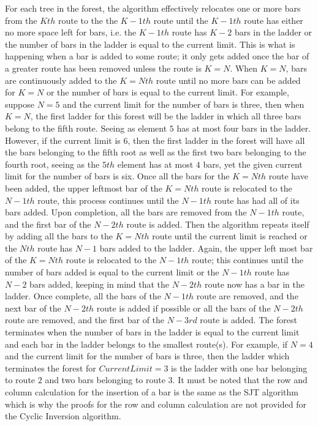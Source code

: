 For each tree in the forest, the algorithm effectively relocates one or more bars from the $Kth$ route to the the $K-1th$ route 
until the $K-1th$ route has either no more space left for bars, i.e. the $K-1th$ route has $K-2$ bars in the ladder or the number of 
bars in the ladder is equal to the current limit. This is what is happening when 
a bar is added to some route; it only gets added once the bar of a greater route has been removed unless the route is $K=N$. When $K=N$, 
bars are continuously added to the $K=Nth$ route until no more bars can be added for $K=N$ or the number of bars is equal to the current limit. 
For example, suppose $N=5$ and the current limit for the number of bars is three, then when $K=N$, the first ladder for this forest will 
be the ladder in which all three bars belong to the fifth route. Seeing as element $5$ has at most four bars in the ladder. However, 
if the current limit is 6, then the first ladder in the forest will have all the bars belonging to the fifth root as well as the first two bars 
belonging to the fourth root, seeing as the $5th$ element has at most $4$ bars, yet the given current limit for the number of bars is six. Once 
all the bars for the $K=Nth$ route have been added, the upper leftmost bar of the $K=Nth$ route is relocated to the $N-1th$ route, this process 
continues until the $N-1th$ route has had all of its bars added. Upon completion, all the bars are removed from the $N-1th$ route, and the 
first bar of the $N-2th$ route is added. Then the algorithm repeats itself by adding all the bars to the $K=Nth$ route until the current limit 
is reached or the $Nth$ route has $N-1$ bars added to the ladder. Again, the upper left most bar 
of the $K=Nth$ route is relocated to the $N-1th$ route; this continues until the number of bars added is equal to the current limit or 
the $N-1th$ route has $N-2$ bars added, keeping in mind that the $N-2th$ route now has a bar in the ladder. Once complete, all the bars of the 
$N-1th$ route are removed, and the next bar of the $N-2th$ route is added if possible or all the bars of the $N-2th$ route are removed, and the 
first bar of the $N-3rd$ route is added. The forest terminates when the number of bars in the ladder is equal to the current limit and 
each bar in the ladder belongs to the smallest route(s). For example, if $N=4$ and the current limit for the number of bars is three, then 
the ladder which terminates the forest for $CurrentLimit=3$ is the ladder with one bar belonging to route $2$ and two bars belonging to route 
$3$. It must be noted that the row and column calculation for the insertion of a bar is the same as the SJT algorithm which is why the proofs 
for the row and column calculation are not provided for the Cyclic Inversion algorithm. 
